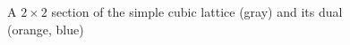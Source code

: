 \begin{figure}[!ht]
\begin{tikzpicture}
        
        
    \end{tikzpicture}
    \caption{A $2 \times 2$ section of the simple cubic lattice (gray) and its dual (orange, blue)}
    \label{fig:z3_dual}
\end{figure}